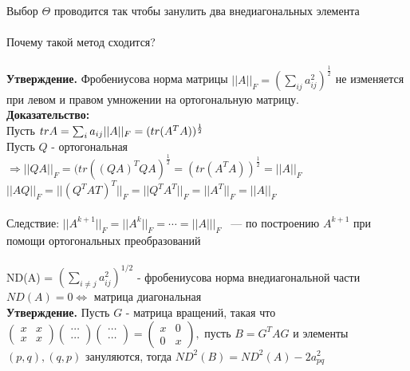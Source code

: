     Выбор $\Theta$ проводится так чтобы занулить два внедиагональных элемента\\
    \\ 
    Почему такой метод сходится?\\ \\ 
\textbf{Утверждение.} Фробениусова норма матрицы \(||A||_F = (\sum_{ij}a_{ij}^2)^{\frac{1}{2}}\) не изменяется при левом и правом умножении на ортогональную матрицу. \\
    
    \textbf{Доказательство:} \\
    Пусть \(tr A = \sum_ia_{ij}\\
    ||A||_F = (tr(A^TA))^{\frac{1}{2}}\) \\
    Пусть \(Q\) - ортогональная \(\Rightarrow ||QA||_F=(tr((QA)^TQA)^{\frac{1}{2}} = (tr(A^TA))^{\frac{1}{2}} = ||A||_F\) \\
    \(||AQ||_F = ||(Q^{T}A{T})^{T}||_{F} = ||Q^{T}A^{T}||_{F} = ||A^{T}||_{F} = ||A||_F\) \\
    \\
    Следствие: \(||A^{k+1}||_F=||A^k||_F=\cdots=||A|||_F\) ~--- по построению \(A^{k+1}\) при помощи ортогональных преобразований \\
    \\
    ND(A) = \((\sum_{i \neq j}a_{ij}^2)^{1/2}\) - фробениусова норма внедиагональной части \\
    \(ND(A) = 0 \Leftrightarrow\) матрица диагональная \\

\textbf{Утверждение.} Пусть \(G\) - матрица вращений, такая что \(
    \begin{pmatrix}
      x & x \\ x & x   
    \end{pmatrix} 
    \begin{pmatrix}
        \cdots \\ \cdots
    \end{pmatrix}
    \begin{pmatrix}
        \cdots \\ \cdots
    \end{pmatrix} = 
    \begin{pmatrix}
      x & 0 \\ 0 & x   
    \end{pmatrix}, 
    \) пусть \(B = G^TAG\) и элементы \((p, q), (q, p)\) зануляются, тогда \(ND^2(B) = ND^2(A) - 2a_{pq}^2\) \\

